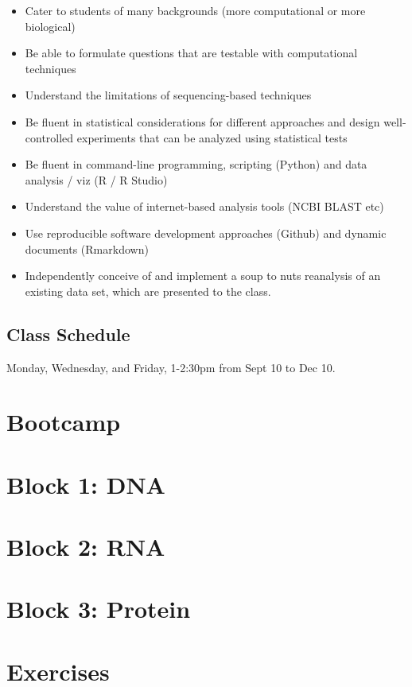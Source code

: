\documentclass[]{book}
\providecommand{\tightlist}{%
  \setlength{\itemsep}{0pt}\setlength{\parskip}{0pt}}
\begin{document}
\begin{itemize}
\tightlist
\item
  Cater to students of many backgrounds (more computational or more biological)
\item
  Be able to formulate questions that are testable with computational techniques
\item
  Understand the limitations of sequencing-based techniques
\item
  Be fluent in statistical considerations for different approaches and design well-controlled experiments that can be analyzed using statistical tests
\item
  Be fluent in command-line programming, scripting (Python) and data analysis / viz (R / R Studio)
\item
  Understand the value of internet-based analysis tools (NCBI BLAST etc)
\item
  Use reproducible software development approaches (Github) and dynamic documents (Rmarkdown)
\item
  Independently conceive of and implement a soup to nuts reanalysis of an existing data set, which are presented to the class.
\end{itemize}

\hypertarget{class-schedule}{%
\section{Class Schedule}\label{class-schedule}}

Monday, Wednesday, and Friday, 1-2:30pm from Sept 10 to Dec 10.

\hypertarget{bootcamp}{%
\chapter{Bootcamp}\label{bootcamp}}

\hypertarget{block-dna}{%
\chapter{Block 1: DNA}\label{block-dna}}

\hypertarget{block-rna}{%
\chapter{Block 2: RNA}\label{block-rna}}

\hypertarget{block-protein}{%
\chapter{Block 3: Protein}\label{block-protein}}

\hypertarget{exercises}{%
\chapter{Exercises}\label{exercises}}


\end{document}
